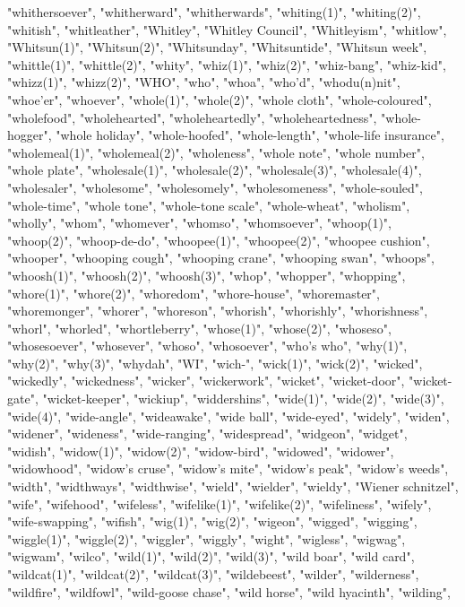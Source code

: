 "whithersoever",
"whitherward",
"whitherwards",
"whiting(1)",
"whiting(2)",
"whitish",
"whitleather",
"Whitley",
"Whitley Council",
"Whitleyism",
"whitlow",
"Whitsun(1)",
"Whitsun(2)",
"Whitsunday",
"Whitsuntide",
"Whitsun week",
"whittle(1)",
"whittle(2)",
"whity",
"whiz(1)",
"whiz(2)",
"whiz-bang",
"whiz-kid",
"whizz(1)",
"whizz(2)",
"WHO",
"who",
"whoa",
"who'd",
"whodu(n)nit",
"whoe'er",
"whoever",
"whole(1)",
"whole(2)",
"whole cloth",
"whole-coloured",
"wholefood",
"wholehearted",
"wholeheartedly",
"wholeheartedness",
"whole-hogger",
"whole holiday",
"whole-hoofed",
"whole-length",
"whole-life insurance",
"wholemeal(1)",
"wholemeal(2)",
"wholeness",
"whole note",
"whole number",
"whole plate",
"wholesale(1)",
"wholesale(2)",
"wholesale(3)",
"wholesale(4)",
"wholesaler",
"wholesome",
"wholesomely",
"wholesomeness",
"whole-souled",
"whole-time",
"whole tone",
"whole-tone scale",
"whole-wheat",
"wholism",
"wholly",
"whom",
"whomever",
"whomso",
"whomsoever",
"whoop(1)",
"whoop(2)",
"whoop-de-do",
"whoopee(1)",
"whoopee(2)",
"whoopee cushion",
"whooper",
"whooping cough",
"whooping crane",
"whooping swan",
"whoops",
"whoosh(1)",
"whoosh(2)",
"whoosh(3)",
"whop",
"whopper",
"whopping",
"whore(1)",
"whore(2)",
"whoredom",
"whore-house",
"whoremaster",
"whoremonger",
"whorer",
"whoreson",
"whorish",
"whorishly",
"whorishness",
"whorl",
"whorled",
"whortleberry",
"whose(1)",
"whose(2)",
"whoseso",
"whosesoever",
"whosever",
"whoso",
"whosoever",
"who's who",
"why(1)",
"why(2)",
"why(3)",
"whydah",
"WI",
"wich-",
"wick(1)",
"wick(2)",
"wicked",
"wickedly",
"wickedness",
"wicker",
"wickerwork",
"wicket",
"wicket-door",
"wicket-gate",
"wicket-keeper",
"wickiup",
"widdershins",
"wide(1)",
"wide(2)",
"wide(3)",
"wide(4)",
"wide-angle",
"wideawake",
"wide ball",
"wide-eyed",
"widely",
"widen",
"widener",
"wideness",
"wide-ranging",
"widespread",
"widgeon",
"widget",
"widish",
"widow(1)",
"widow(2)",
"widow-bird",
"widowed",
"widower",
"widowhood",
"widow's cruse",
"widow's mite",
"widow's peak",
"widow's weeds",
"width",
"widthways",
"widthwise",
"wield",
"wielder",
"wieldy",
"Wiener schnitzel",
"wife",
"wifehood",
"wifeless",
"wifelike(1)",
"wifelike(2)",
"wifeliness",
"wifely",
"wife-swapping",
"wifish",
"wig(1)",
"wig(2)",
"wigeon",
"wigged",
"wigging",
"wiggle(1)",
"wiggle(2)",
"wiggler",
"wiggly",
"wight",
"wigless",
"wigwag",
"wigwam",
"wilco",
"wild(1)",
"wild(2)",
"wild(3)",
"wild boar",
"wild card",
"wildcat(1)",
"wildcat(2)",
"wildcat(3)",
"wildebeest",
"wilder",
"wilderness",
"wildfire",
"wildfowl",
"wild-goose chase",
"wild horse",
"wild hyacinth",
"wilding",
